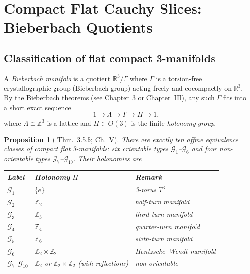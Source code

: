 \documentclass[12pt, a4paper]{article}
\newtheorem{proposition}[theorem]{Proposition}
\theoremstyle{remark}
\newcommand{\bR}{\mathbb{R}}
\newcommand{\bZ}{\mathbb{Z}}
\begin{document}
\section{Compact Flat Cauchy Slices: Bieberbach Quotients}\label{sec:bieberbach}

\subsection{Classification of flat compact 3-manifolds}

A \emph{Bieberbach manifold} is a quotient $\bR^3/\Gamma$ where $\Gamma$
is a torsion-free crystallographic group (Bieberbach group) acting freely
and cocompactly on $\bR^3$.
By the Bieberbach theorems (see \cite{Wolf72} Chapter~3 or
\cite{Char86} Chapter~III), any such $\Gamma$ fits into a short exact
sequence
\begin{equation}\label{eq:Bieberbach-ext}
  1 \to \Lambda \to \Gamma \to H \to 1,
\end{equation}
where $\Lambda \cong \bZ^3$ is a lattice and $H \subset O(3)$ is the
finite \emph{holonomy group}.

\begin{proposition}[\cite{Wolf72} Thm.~3.5.5; \cite{Char86} Ch.~V]
  \label{prop:10classes}
  There are exactly \emph{ten affine equivalence classes} of compact flat
  3-manifolds: six orientable types $\mathcal{G}_1$--$\mathcal{G}_6$ and
  four non-orientable types $\mathcal{G}_7$--$\mathcal{G}_{10}$.
  Their holonomies are
  \begin{center}
  \begin{tabular}{lll}
    \hline
    Label & Holonomy $H$ & Remark \\
    \hline
    $\mathcal{G}_1$ & $\{e\}$ & 3-torus $T^3$ \\
    $\mathcal{G}_2$ & $\bZ_2$ & half-turn manifold \\
    $\mathcal{G}_3$ & $\bZ_3$ & third-turn manifold \\
    $\mathcal{G}_4$ & $\bZ_4$ & quarter-turn manifold \\
    $\mathcal{G}_5$ & $\bZ_6$ & sixth-turn manifold \\
    $\mathcal{G}_6$ & $\bZ_2\times\bZ_2$ & Hantzsche--Wendt manifold \\
    \hline
    $\mathcal{G}_7$--$\mathcal{G}_{10}$ & $\bZ_2$ or $\bZ_2\times\bZ_2$
       (with reflections) & non-orientable \\
    \hline
  \end{tabular}
  \end{center}
\end{proposition}
\end{document}
